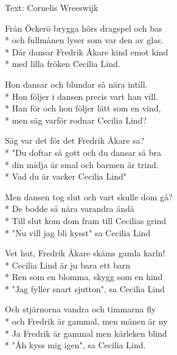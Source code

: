 \begin{SongText}
\begin{SongInfo}
    Text: Cornelis Wreeswijk
\end{SongInfo}
\begin{SongVerse}
Från Öckerö brygga hörs dragspel och bas\\*%
och fullmånen lyser som var den av glas.\\*%
Där dansar Fredrik Åkare kind emot kind\\*%
med lilla fröken Cecilia Lind.
\end{SongVerse}
\begin{SongVerse}
Hon dansar och blundar så nära intill.\\*%
Hon följer i dansen precis vart han vill.\\*%
Han för och hon följer lätt som en vind,\\*%
men säg varför rodnar Cecilia Lind?
\end{SongVerse}
\begin{SongVerse}
Säg var det för det Fredrik Åkare sa?\\*%
"Du doftar så gott och du dansar så bra\\*%
din midja är smal och barmen är trind.\\*%
Vad du är vacker Cecilia Lind"
\end{SongVerse}
\begin{SongVerse}
Men dansen tog slut och vart skulle dom gå?\\*%
De bodde så nära varandra ändå\\*%
Till slut kom dom fram till Cecilias grind\\*%
"Nu vill jag bli kysst" sa Cecilia Lind 
\end{SongVerse}
\begin{SongVerse}
Vet hut, Fredrik Åkare skäms gamla karln!\\*%
Cecilia Lind är ju bara ett barn\\*%
Ren som en blomma, skygg som en hind\\*%
"Jag fyller snart sjutton", sa Cecilia Lind
\end{SongVerse}
\begin{SongVerse}
Och stjärnorna vandra och timmarna fly\\*%
och Fredrik är gammal, men månen är ny\\*%
Ja Fredrik är gammal men kärleken blind\\*%
"Åh kyss mig igen", sa Cecilia Lind.
\end{SongVerse}
\end{SongText}
